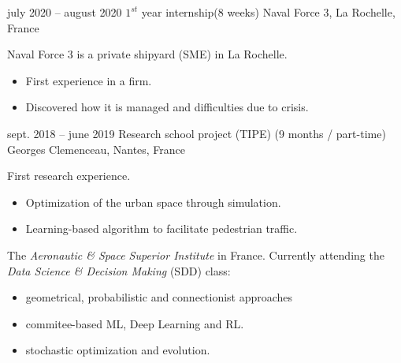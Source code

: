 \documentclass[
	a4paper,
]{fortysecondscv}
\begin{document}
\newpage
\makebacksidebar
{}
\begin{cvtable}[2]
	\cvitem
    	{july 2020 -- august 2020}
    	{$1^{st}$ year internship\newline (8 weeks)}
    	{Naval Force 3, La Rochelle, France}
    	{
	        Naval Force 3 is a private shipyard (SME) in La Rochelle.
    	    \begin{itemize}
            	\item First experience in a firm.
            	\item Discovered how it is managed and difficulties due to crisis.
    	    \end{itemize}
    	}
	\cvitem
    	{sept. 2018 -- june 2019}
    	{Research school project (TIPE) \newline (9 months / part-time)}
    	{Georges Clemenceau, Nantes, France}
    	 {
            First research experience.
    	    \begin{itemize}
            	\item Optimization of the urban space through simulation.
            	\item Learning-based algorithm to facilitate pedestrian traffic.
    	    \end{itemize}
    	}
\end{cvtable}


\begin{cvtable}[1.5]
	{
    	The \textit{Aeronautic \& Space Superior Institute} in France. \newline
        Currently attending the \textit{Data Science \& Decision Making} (SDD) class:
        \begin{itemize}
            \item geometrical, probabilistic and connectionist approaches
            \item commitee-based ML, Deep Learning and RL.
            \item stochastic optimization and evolution.
        \end{itemize}
	}

\end{cvtable}
\end{document}
